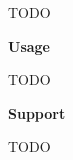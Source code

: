 \documentclass[a4paper]{artikel3}
\renewcommand{\paragraph}[1]{{\bf #1} }
\begin{document}
TODO

\paragraph{Usage}%

TODO

\paragraph{Support}%

TODO
\end{document}
